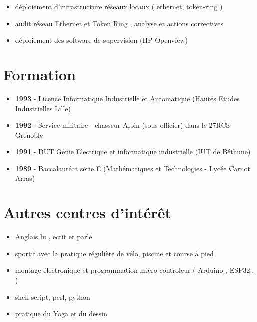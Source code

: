 \documentclass[11pt,a4paper]{moderncv}
\begin{document}
 {}{
\begin{itemize}%
  \item déploiement d'infrastructure réseaux locaux ( ethernet, token-ring  ) 
   \item audit réseau Ethernet et Token Ring , analyse et actions correctives 
   \item déploiement des software de supervision (HP Openview)   \newline
\end{itemize}}


\section{Formation}
\cventry{}{} {}{} {} {
\begin{itemize}
 \item \textbf{ 1993 } - Licence Informatique Industrielle et Automatique (Hautes Etudes Industrielles Lille) 
 \item \textbf{ 1992 } - Service militaire - chasseur Alpin (sous-officier) dans le 27RCS Grenoble 
 \item \textbf{ 1991 } - DUT Génie Electrique et informatique industrielle (IUT de Béthune) 
 \item \textbf{ 1989 } - Baccalauréat série E (Mathématiques et Technologies - Lycée Carnot Arras)   \newline
 \end{itemize}}

\section{Autres centres d'intérêt}
\cventry{}{} {}{} {} {
\begin{itemize}
 \item  Anglais lu , écrit et parlé   
 \item  sportif avec la pratique régulière de vélo, piscine et course à pied  
 \item  montage électronique et programmation micro-controleur ( Arduino , ESP32.. ) 
 \item  shell script, perl, python 
 \item  pratique du Yoga et du dessin 
 \end{itemize}}
 
\end{document}
